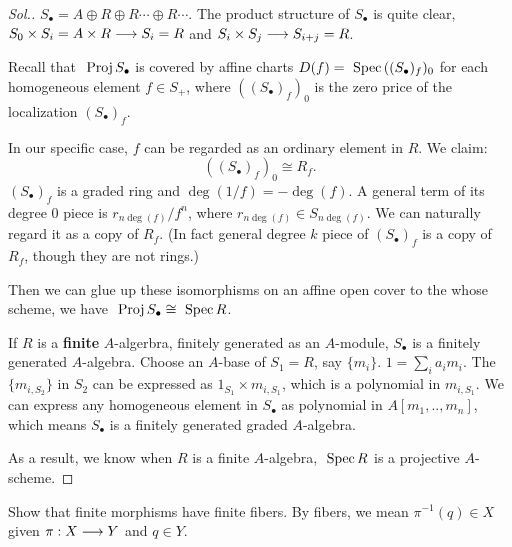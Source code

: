 \documentclass[11pt]{book} %
\begin{document}
\begin{proof}[Sol.]
$S_\bullet=A\oplus R \oplus R\cdots \oplus R\cdots$.
The product structure of $S_\bullet$ is quite clear,  $S_{0}\times S_i=A\times R\longrightarrow S_i =R$ and $S_{i}\times S_{j}\longrightarrow S_{i+j}=R$.

Recall that $\text{ Proj\,} S_\bullet$ is covered by affine charts $D(f)=\text{ Spec\,} ((S_\bullet)_f)_0$ for each homogeneous element $f\in S_+$, where $((S_\bullet)_f)_0$ is the zero price of the localization $(S_\bullet)_f$.

In our specific case, $f$ can be regarded as an ordinary element in $R$. We claim:
$$
((S_\bullet)_f)_0\cong R_f.
$$ 
$(S_\bullet)_f$ is a graded ring and $\deg(1/f)=-\deg(f)$. A general term of its degree $0$ piece is $r_{n \deg(f)}/f^{n}$, where $r_{n \deg(f)}\in S_{n \deg(f)}$. We can naturally regard it as a copy of $R_f$. (In fact general degree $k$ piece of $(S_{\bullet})_f$ is a copy of $R_f$, though they are not rings.) 

Then we can glue up these isomorphisms on an affine open cover to the whose scheme, we have $\text{ Proj\,} S_\bullet\cong \text{ Spec\,} R$.

If $R$ is a \textbf{finite} $A$-algerbra, finitely generated as an $A$-module, $S_\bullet$ is a finitely generated $A$-algebra. Choose an $A$-base of $S_1=R$, say $\{m_i\}$. $1=\sum_i a_i m_i$. The $\{m_{i,S_2}\}$ in $S_2$ can be expressed as $1_{S_1}\times m_{i,S_1}$, which is a polynomial in $m_{i,S_1}$. We can express any homogeneous element in $S_\bullet$ as polynomial  in $A[m_1,..,m_n]$, which means $S_\bullet$ is a finitely generated graded $A$-algebra.

As a result, we know when $R$ is a finite $A$-algebra, $\text{ Spec\,} R$ is a projective $A$-scheme.
\end{proof}
\begin{exr}
Show that finite morphisms have finite fibers. By fibers, we mean $\pi^{-1}(q)\in X$ given $\pi:X\longrightarrow Y$ and $q\in Y$.
\end{exr}
\end{document}
